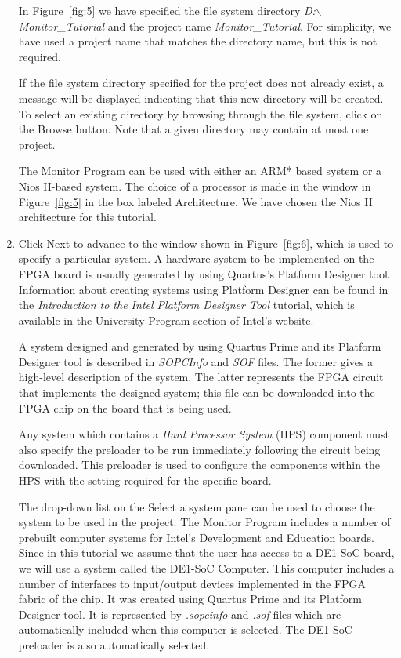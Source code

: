 \documentclass[11pt, twoside, pdftex]{article}
\begin{document}
\begin{enumerate}
In Figure~\ref{fig:5} we have specified the file system directory
{\it D:$\backslash$Monitor\_Tutorial} and the project 
name {\it Monitor\_Tutorial}. 
For simplicity, we have used a project name that matches the
directory name, but this is not required.

If the file system directory specified for the project does not
already exist, a message will be displayed indicating that this
new directory will be created. To select an existing directory
by browsing through the file system, click on the {\sf Browse} button. Note that a given directory may contain at most one
project.

The Monitor Program can be used with either an ARM* based system
or a Nios II-based system. The choice of a processor is made in
the window in Figure~\ref{fig:5} in the box labeled Architecture. 
We have chosen the Nios II architecture for this tutorial. 

\item
Click {\sf Next} to advance to the window shown in Figure~\ref{fig:6},
which is used to specify a particular system.
A hardware system to be implemented on the FPGA board is usually
generated by using Quartus's Platform Designer tool.
Information about creating systems using Platform Designer can be found in the \emph{Introduction to the Intel Platform Designer Tool} tutorial, 
which is available in the University Program section of Intel's website.

A system designed and generated by using Quartus Prime and its Platform Designer
tool is described in \emph{SOPCInfo} and \emph{SOF} files. The
former gives a high-level description of the system. 
The latter represents the FPGA
circuit that implements the designed system; this file can be downloaded into the FPGA chip on the board that is being used.   

Any system which contains a {\it Hard Processor System} (HPS) component must also specify the preloader to be run immediately following the circuit being downloaded. This preloader is used to configure the components within the HPS with the setting required for the specific board. 

The drop-down list on the {\sf Select a system} pane can be used
to choose the system to be used in the project. 
The Monitor Program includes a number of prebuilt computer
systems for Intel's Development and Education boards.
Since in this tutorial we assume that the user has access to a
DE1-SoC board, we will use a system called the DE1-SoC Computer. 
This computer includes a number of interfaces to 
input/output devices implemented in the FPGA fabric of the chip.
It was created using Quartus Prime and its Platform Designer tool.
It is represented by \emph{.sopcinfo} and \emph{.sof} files
which are automatically included when this computer is selected.
The DE1-SoC preloader is also automatically selected.


\end{enumerate}
\end{document}
